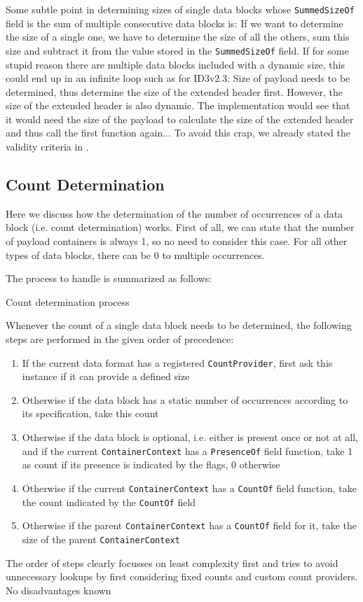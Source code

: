 Some subtle point in determining sizes of single data blocks whose \texttt{SummedSizeOf} field is the sum of multiple consecutive data blocks is: If we want to determine the size of a single one, we have to determine the size of all the others, sum this size and subtract it from the value stored in the \texttt{SummedSizeOf} field. If for some stupid reason there are multiple data blocks included with a dynamic size, this could end up in an infinite loop such as for ID3v2.3: Size of payload needs to be determined, thus determine the size of the extended header first. However, the size of the extended header is also dynamic. The implementation would see that it would need the size of the payload to calculate the size of the extended header and thus call the first function again... To avoid this crap, we already stated the validity criteria in .

\subsection{Count Determination}%
\label{sec:CountDetermination}%

Here we discuss how the determination of the number of occurrences of a data block (i.e. count determination) works. First of all, we can state that the number of payload containers is always 1, so no need to consider this case. For all other types of data blocks, there can be 0 to multiple occurrences.

The process to handle is summarized as follows:

{%
Count determination process
}
{%
  Whenever the count of a single data block needs to be determined, the following steps are performed in the given order of precedence:
\begin{enumerate}
\item If the current data format has a registered \texttt{CountProvider}, first ask this instance if it can provide a defined size
\item Otherwise if the data block has a static number of occurrences according to its specification, take this count
\item Otherwise if the data block is optional, i.e. either is present once or not at all, and if the current \texttt{ContainerContext} has a \texttt{PresenceOf} field function, take 1 as count if its presence is indicated by the flags, 0 otherwise
\item Otherwise if the current \texttt{ContainerContext} has a \texttt{CountOf} field function, take the count indicated by the \texttt{CountOf} field
\item Otherwise if the parent \texttt{ContainerContext} has a \texttt{CountOf} field for it, take the size of the parent \texttt{ContainerContext}
\end{enumerate}
}
{%
The order of steps clearly focusses on least complexity first and tries to avoid unnecessary lookups by first considering fixed counts and custom count providers.
}
{%
No disadvantages known
}


